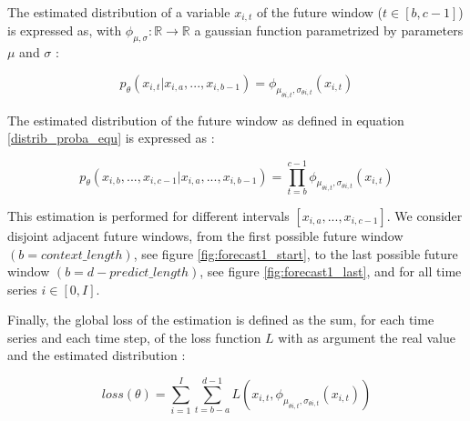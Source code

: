 The estimated distribution of a variable $x_{i,t}$ of the future window ($t \in [b,c-1]$) is expressed as, with $\phi_{\mu,\sigma}: \mathbb{R} \to \mathbb{R} $ a gaussian function parametrized by parameters $\mu$ and $\sigma$ :

\begin{equation}
    p_{\theta}(x_{i,t} | x_{i,a}, ..., x_{i,b-1}) = \phi_{\mu_{\theta i,t},\sigma_{\theta i,t}}(x_{i,t})
\end{equation}

The estimated distribution of the future window as defined in equation \ref{distrib_proba_equ} is expressed as :

\begin{equation}
    p_{\theta}(x_{i,b}, ..., x_{i,c-1} | x_{i,a}, ..., x_{i,b-1})  = \prod_{t=b}^{c-1}\phi_{\mu_{\theta i,t},\sigma_{\theta i,t}}(x_{i,t})
\end{equation}



This estimation is performed for different intervals $[x_{i,a},...,x_{i,c-1}]$. We consider disjoint adjacent future windows, from the first possible future window $(b = context\_length)$, see figure \ref{fig:forecast1_start}, to the last possible future window $(b=d-predict\_length)$, see figure \ref{fig:forecast1_last}, and for all time series $i \in [0,I]$.
 
 



Finally, the global loss of the estimation is defined as the sum, for each time series and each time step,  of the loss function $L$ with as argument the real value and the estimated distribution :


\begin{equation}
    loss(\theta) = \sum^{I}_{i=1}\sum^{d-1}_{t=b-a}L(x_{i,t},\phi_{\mu_{\theta i,t},\sigma_{\theta i,t}}(x_{i,t}))
\end{equation}










